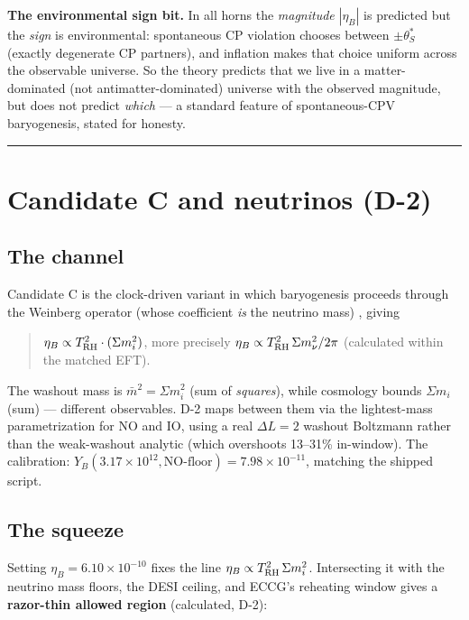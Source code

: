 \documentclass[aps,prd,preprint,nofootinbib,superscriptaddress]{revtex4-2}
\begin{document}
\textbf{The environmental sign bit.} In all horns the \emph{magnitude}
\(|\eta_B|\) is predicted but the \emph{sign} is environmental:
spontaneous CP violation chooses between \(\pm\theta_S^{*}\) (exactly
degenerate CP partners), and inflation makes that choice uniform across
the observable universe. So the theory predicts that we live in a
matter-dominated (not antimatter-dominated) universe with the observed
magnitude, but does not predict \emph{which} --- a standard feature of
spontaneous-CPV baryogenesis, stated for honesty.

\begin{center}\rule{0.5\linewidth}{0.5pt}\end{center}

\section{Candidate C and neutrinos (D-2)}\label{sec-5}

\subsection{The channel}\label{sec-5-1}

Candidate C is the clock-driven variant in which baryogenesis proceeds
through the Weinberg operator (whose coefficient \emph{is} the neutrino
mass) \citep{Davidson:2008bu}, giving

\begin{quote}
\(\eta_B \propto T_{\rm RH}^{2} \cdot (\Sigma m_i^{2})\), more precisely
\(\eta_B \propto T_{\rm RH}^{2}\, \Sigma m_\nu^{2} / 2\pi\) (calculated
within the matched EFT).
\end{quote}

The washout mass is \(\bar{m}^{2} = \Sigma m_i^{2}\) (sum of
\emph{squares}), while cosmology bounds \(\Sigma m_i\) (sum) ---
different observables. D-2 maps between them via the lightest-mass
parametrization for NO and IO, using a real \(\Delta L=2\) washout
Boltzmann rather than the weak-washout analytic (which overshoots
13--31\% in-window). The calibration:
\(Y_B(3.17\times10^{12}, \text{NO-floor}) = 7.98\times10^{-11}\),
matching the shipped script.

\subsection{The squeeze}\label{sec-5-2}

Setting \(\eta_B = 6.10\times10^{-10}\) fixes the line
\(\eta_B \propto T_{\rm RH}^{2}\, \Sigma m_i^{2}\). Intersecting it with
the neutrino mass floors, the DESI ceiling, and ECCG's reheating window
gives a \textbf{razor-thin allowed region} (calculated, D-2):
\end{document}

